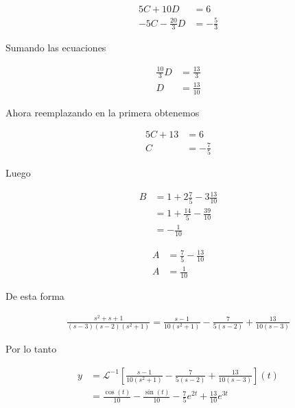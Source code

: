 \documentclass{article}
\theoremstyle{plain}
\theoremstyle{definition}
\begin{document}
\begin{align*}
    5C+10D&= 6 \\
    -5C-\frac{20}{3}D&= -\frac{5}{3}
\end{align*}


Sumando las ecuaciones


\begin{align*}
    \frac{10}{3}D &=\frac{13}{3} \\
    D &= \frac{13}{10}
\end{align*}

Ahora reemplazando en la primera obtenemos


\begin{align*}
    5C+13&= 6 \\
    C &= -\frac{7}{5}
\end{align*}

Luego

\begin{align*}
    B &= 1+2\frac{7}{5}-3\frac{13}{10} \\
    &= 1+\frac{14}{5}-\frac{39}{10} \\
    &= -\frac{1}{10}
\end{align*}

\begin{align*}
    A &=\frac{7}{5}-\frac{13}{10} \\
    A &=\frac{1}{10}
\end{align*}

De esta forma

\begin{align*}
    \frac{s^2+s+1}{(s-3)(s-2)(s^2+1)} = \frac{s-1}{10(s^2+1)}-\frac{7}{5(s-2)}+\frac{13}{10(s-3)}
\end{align*}

Por lo tanto

\begin{align*}
    y &= \mathcal{L}^{-1}\left[ \frac{s-1}{10(s^2+1)}-\frac{7}{5(s-2)}+\frac{13}{10(s-3)}\right] (t) \\
    &= \frac{\cos(t)}{10}-\frac{\sin(t)}{10}-\frac{7}{5}e^{2t}+\frac{13}{10}e^{3t}
\end{align*}
\end{document}
